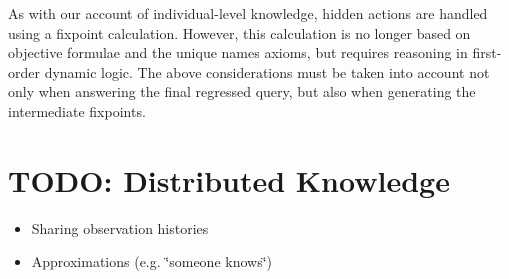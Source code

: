 As with our account of individual-level knowledge, hidden actions
are handled using a fixpoint calculation. However, this calculation
is no longer based on objective formulae and the unique names axioms,
but requires reasoning in first-order dynamic logic. The above considerations
must be taken into account not only when answering the final regressed
query, but also when generating the intermediate fixpoints.


\section{TODO: Distributed Knowledge}

\begin{itemize}
\item Sharing observation histories 
\item Approximations (e.g. \char`\"{}someone knows\char`\"{}) 
\end{itemize}
\label{ch:references}  


